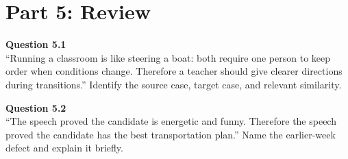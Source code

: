\documentclass[12pt]{article}
\begin{document}
\newpage

\section*{Part 5: Review}

\textbf{Question 5.1}\\[-0.15em]
``Running a classroom is like steering a boat: both require one person to keep order when conditions change. Therefore a teacher should give clearer directions during transitions.'' Identify the source case, target case, and relevant similarity.


\textbf{Question 5.2}\\[-0.15em]
``The speech proved the candidate is energetic and funny. Therefore the speech proved the candidate has the best transportation plan.'' Name the earlier-week defect and explain it briefly.

\end{document}
